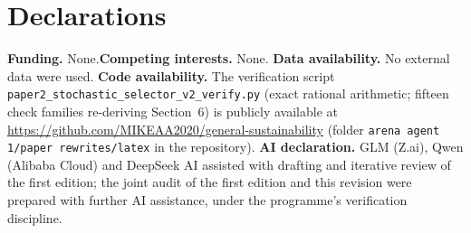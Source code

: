 \documentclass[10pt,twocolumn]{article}
\theoremstyle{definition}
\begin{document}
\section*{Declarations}

\textbf{Funding.} None.\quad \textbf{Competing interests.} None.\quad
\textbf{Data availability.} No external data were used.\quad
\textbf{Code availability.} The verification script
\texttt{paper2\_stochastic\_selector\_v2\_verify.py} (exact rational
arithmetic; fifteen check families re-deriving Section~6) is publicly
available at \url{https://github.com/MIKEAA2020/general-sustainability}
(folder \texttt{arena agent 1/paper rewrites/latex} in the repository).\quad
\textbf{AI declaration.} GLM (Z.ai), Qwen (Alibaba Cloud) and DeepSeek AI
assisted with drafting and iterative review of the first edition; the
joint audit of the first edition and this revision were prepared with
further AI assistance, under the programme's verification discipline.
\end{document}
